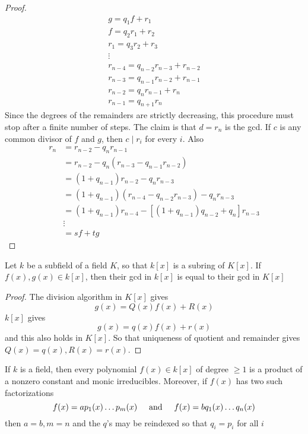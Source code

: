 \documentclass[11pt]{article}
\begin{document}
\begin{proof}
\begin{gather*}
g=q_1f+r_1\\
f=q_2r_1+r_2\\
r_1=q_3r_2+r_3\\
\vdots\\
r_{n-4}=q_{n-2}r_{n-3}+r_{n-2}\\
r_{n-3}=q_{n-1}r_{n-2}+r_{n-1}\\
r_{n-2}=q_nr_{n-1}+r_n\\
r_{n-1}=q_{n+1}r_n
\end{gather*}
Since the degrees of the remainders are strictly decreasing, this procedure
must stop after a finite number of steps. The claim is that \(d=r_n\) is the
gcd. If \(c\) is any common divisor of \(f\) and \(g\), then \(c\mid r_i\)  for every
\(i\). Also
\begin{align*}
r_n&=r_{n-2}-q_nr_{n-1}\\
&=r_{n-2}-q_n(r_{n-3}-q_{n-1}r_{n-2})\\
&=(1+q_{n-1})r_{n-2}-q_nr_{n-3}\\
&=(1+q_{n-1})(r_{n-4}-q_{n-2}r_{n-3})-q_nr_{n-3}\\
&=(1+q_{n-1})r_{n-4}-[(1+q_{n-1})q_{n-2}+q_n]r_{n-3}\\
&\vdots\\
&=sf+tg
\end{align*}
\end{proof}

\begin{corollary}[]
Let \(k\) be a subfield of a field \(K\), so that \(k[x]\) is a subring of \(K[x]\).
If \(f(x),g(x)\in k[x]\), then their gcd in \(k[x]\) is equal to their gcd in \(K[x]\)
\end{corollary}

\begin{proof}
The division algorithm in \(K[x]\) gives
\begin{equation*}
g(x)=Q(x)f(x)+R(x)
\end{equation*}
\(k[x]\) gives
\begin{equation*}
g(x)=q(x)f(x)+r(x)
\end{equation*}
and this also holds in \(K[x]\). So that uniqueness of quotient and remainder
gives \(Q(x)=q(x),R(x)=r(x)\).
\end{proof}

\begin{theorem}
If \(k\) is a field, then every polynomial \(f(x)\in k[x]\) of degree \(\ge1\) is
a product of a nonzero constant and monic irreducibles. Moreover, if \(f(x)\)
has two such factorizations
\begin{equation*}
f(x)=ap_1(x)\dots p_m(x)\hspace{0.5cm}\text{and}\hspace{0.5cm}
f(x)=bq_1(x)\dots q_n(x)
\end{equation*}
then \(a=b,m=n\) and the \(q\)'s may be reindexed so that \(q_i=p_i\) for all \(i\)
\end{theorem}
\end{document}
